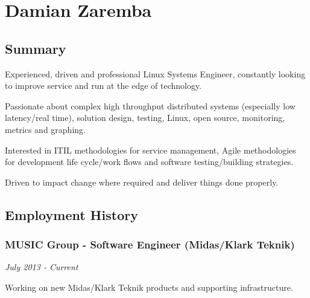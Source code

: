 \section{Damian Zaremba}

\subsection{Summary}

Experienced, driven and professional Linux Systems Engineer, constantly
looking to improve service and run at the edge of technology.

Passionate about complex high throughput distributed systems (especially
low latency/real time), solution design, testing, Linux, open source,
monitoring, metrics and graphing.

Interested in ITIL methodologies for service management, Agile
methodologies for development life cycle/work flows and software
testing/building strategies.

Driven to impact change where required and deliver things done properly.

\subsection{Employment History}

\subsubsection{MUSIC Group - Software Engineer (Midas/Klark Teknik)}

\emph{July 2013 - Current}

Working on new Midas/Klark Teknik products and supporting
infrastructure.

